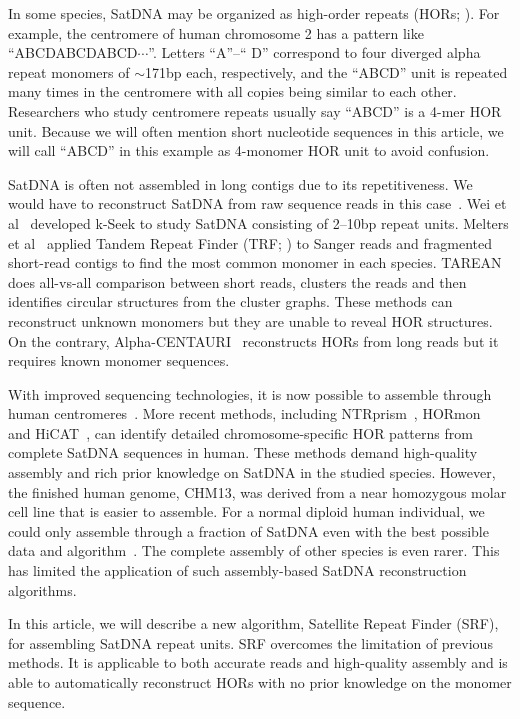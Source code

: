 \documentclass{bioinfo}
\begin{document}
In some species, SatDNA may be organized as high-order repeats
(HORs; \citealt{Miga:2019aa}).  For example, the centromere of human chromosome 2
has a pattern like ``{\sf ABCDABCDABCD$\cdots$}''. Letters ``{\sf A}''--``{\sf
D}'' correspond to four diverged alpha repeat monomers of $\sim$171bp each,
respectively, and the ``{\sf ABCD}'' unit is repeated many times in the
centromere with all copies being similar to each other. Researchers who study
centromere repeats usually say ``{\sf ABCD}'' is a 4-mer HOR unit. Because we
will often mention short nucleotide sequences in this article, we will call
``{\sf ABCD}'' in this example as 4-monomer HOR unit to avoid confusion.

SatDNA is often not assembled in long contigs due to its repetitiveness.
We would have to reconstruct SatDNA from raw sequence reads in this
case~\citep{Lower:2018aa}.  Wei et al~\citep{Wei:2014vl} developed k-Seek to
study SatDNA consisting of 2--10bp repeat units. Melters et
al~\citep{Melters:2013va} applied Tandem Repeat Finder (TRF;
\citealt{Benson:1999aa}) to Sanger reads and fragmented short-read contigs to
find the most common monomer in each species.  TAREAN~\citep{Novak:2017wx} does
all-vs-all comparison between short reads, clusters the reads and then
identifies circular structures from the cluster graphs. These methods can
reconstruct unknown monomers but they are unable to reveal HOR structures. On
the contrary, Alpha-CENTAURI~\citep{Sevim:2016tl} reconstructs HORs from long
reads but it requires known monomer sequences.

With improved sequencing technologies, it is now possible to assemble through
human centromeres~\citep{Nurk:2022up}. More recent methods, including
NTRprism~\citep{Altemose:2022tv}, HORmon~\citep{Kunyavskaya:2022tx} and
HiCAT~\citep{Gao2022.08.07.502881}, can identify detailed
chromosome-specific HOR patterns from complete SatDNA sequences in human. These
methods demand high-quality assembly and rich prior knowledge on SatDNA in the
studied species. However, the finished human genome, CHM13, was derived from a
near homozygous molar cell line that is easier to assemble. For a normal
diploid human individual, we could only assemble through a fraction of SatDNA
even with the best possible data and
algorithm~\citep{Rautiainen2022.06.24.497523}. The complete assembly of other
species is even rarer. This has limited the application of such assembly-based
SatDNA reconstruction algorithms.

In this article, we will describe a new algorithm, Satellite Repeat Finder
(SRF), for assembling SatDNA repeat units. SRF overcomes the limitation of
previous methods. It is applicable to both accurate reads and high-quality
assembly and is able to automatically reconstruct HORs with no prior knowledge
on the monomer sequence.
\end{document}
